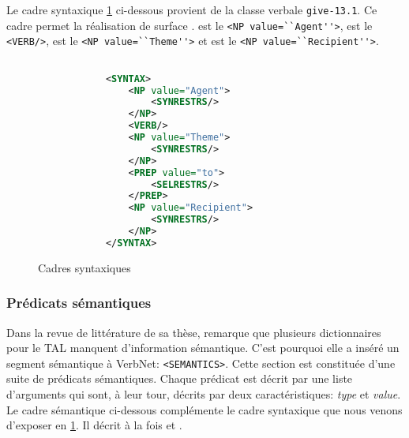 Le cadre syntaxique \ref{cadresynt} ci-dessous provient de la classe verbale \texttt{give-13.1}. Ce cadre permet la réalisation de surface .  est le \lstinline{<NP value=``Agent''>},  est le \lstinline{<VERB/>},  est le \lstinline{<NP value=``Theme''>} et  est le \lstinline{<NP value=``Recipient''>}.

\begin{figure}[htb]
  \caption{Cadres syntaxiques}
	\label{cadresynt}
\begin{lstlisting}[language=Xml]

            <SYNTAX>
                <NP value="Agent">
                    <SYNRESTRS/>
                </NP>
                <VERB/>
                <NP value="Theme">
                    <SYNRESTRS/>
                </NP>
                <PREP value="to">
                    <SELRESTRS/>
                </PREP>
                <NP value="Recipient">
                    <SYNRESTRS/>
                </NP>
            </SYNTAX>
\end{lstlisting}
\end{figure}

\subsubsection{Prédicats sémantiques}
Dans la revue de littérature de sa thèse, \cite{SchulerVerbnetBroadcoverageComprehensive2005} remarque que plusieurs dictionnaires pour le \ac{TAL} manquent d'information sémantique. C'est pourquoi elle a inséré un segment sémantique à VerbNet: \lstinline{<SEMANTICS>}. Cette section est constituée d'une suite de prédicats sémantiques. Chaque prédicat est décrit par une liste d'arguments qui sont, à leur tour, décrits par deux caractéristiques: \emph{type} et \emph{value}. Le cadre sémantique ci-dessous complémente le cadre syntaxique que nous venons d'exposer en \ref{cadresynt}. Il décrit à la fois  et .

